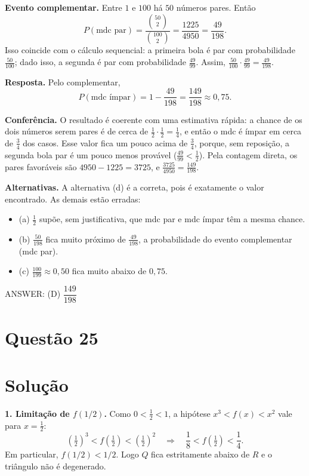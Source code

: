 \documentclass{article}%
\begin{document}
\textbf{Evento complementar.} Entre $1$ e $100$ há $50$ números pares. Então
\[
P(\text{mdc par})=\frac{\binom{50}{2}}{\binom{100}{2}}=\frac{1225}{4950}=\frac{49}{198}.
\]
Isso coincide com o cálculo sequencial: a primeira bola é par com probabilidade $\tfrac{50}{100}$; dado isso, a segunda é par com probabilidade $\tfrac{49}{99}$. Assim, $\tfrac{50}{100}\cdot\tfrac{49}{99}=\tfrac{49}{198}$.

\textbf{Resposta.} Pelo complementar,
\[
P(\text{mdc ímpar})=1-\frac{49}{198}=\frac{149}{198}\approx 0{,}75 .
\]

\textbf{Conferência.} O resultado é coerente com uma estimativa rápida: a chance de os dois números serem pares é de cerca de $\tfrac12\cdot\tfrac12=\tfrac14$, e então o mdc é ímpar em cerca de $\tfrac34$ dos casos. Esse valor fica um pouco acima de $\tfrac34$, porque, sem reposição, a segunda bola par é um pouco menos provável ($\tfrac{49}{99}<\tfrac12$). Pela contagem direta, os pares favoráveis são $4950-1225=3725$, e $\tfrac{3725}{4950}=\tfrac{149}{198}$.

\textbf{Alternativas.} A alternativa (d) é a correta, pois é exatamente o valor encontrado. As demais estão erradas:
\begin{itemize}
\item (a) $\tfrac12$ supõe, sem justificativa, que mdc par e mdc ímpar têm a mesma chance.
\item (b) $\tfrac{50}{198}$ fica muito próximo de $\tfrac{49}{198}$, a probabilidade do evento complementar (mdc par).
\item (c) $\tfrac{100}{199}\approx 0{,}50$ fica muito abaixo de $0{,}75$.
\end{itemize}

ANSWER: (D) $\dfrac{149}{198}$%
\newpage%
\section*{Questão 25}

\section*{Solução}

\textbf{1. Limitação de $f(1/2)$.} Como $0<\tfrac12<1$, a hipótese $x^3<f(x)<x^2$ vale para $x=\tfrac12$:
\[
\left(\tfrac12\right)^3<f\!\left(\tfrac12\right)<\left(\tfrac12\right)^2
\quad\Longrightarrow\quad
\frac18<f\!\left(\tfrac12\right)<\frac14 .
\]
Em particular, $f(1/2)<1/2$. Logo $Q$ fica estritamente abaixo de $R$ e o triângulo não é degenerado.
\end{document}
